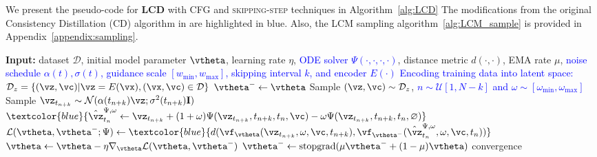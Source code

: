 \documentclass{article} %
\begin{document}
We present the pseudo-code for \textbf{LCD}
with CFG and \textsc{skipping-step} techniques in Algorithm~\ref{alg:LCD}
The modifications from the original Consistency Distillation (CD) algorithm in \cite{song2023consistency} are highlighted in blue.  Also, the LCM sampling algorithm~\ref{alg:LCM_sample} is provided in Appendix~\ref{appendix:sampling}.
\vspace{-10pt}
\begin{algorithm}[H]
    \begin{minipage}{\linewidth}
    \begin{footnotesize}
        \caption{Latent Consistency Distillation (LCD)}\label{alg:LCD}
        \begin{algorithmic}
            \STATE \textbf{Input:} dataset $\mathcal{D}$, initial model parameter $\vtheta$, learning rate $\eta$, \textcolor{blue}{ODE solver $\Psi(\cdot,\cdot,\cdot, \cdot)$}, distance metric $d(\cdot,\cdot)$, EMA rate $\mu$, \textcolor{blue}{noise schedule $\alpha(t),\sigma(t)$, guidance scale $[w_{\text{min}},w_{\text{max}}]$, skipping interval $k$, and encoder $E(\cdot)$}
            \STATE \textcolor{blue}{Encoding training data into latent space: $\mathcal{D}_z=\{(\vz,\vc)|\vz=E(\vx),(\vx,\vc)\in\mathcal{D}\}$}
            \STATE $\vtheta^-\leftarrow\vtheta$
            \REPEAT
            \STATE Sample $(\vz,\vc) \sim \mathcal{D}_z$, \textcolor{blue}{$n\sim \mathcal{U}[1,N-k]$ and $\omega\sim [\omega_\text{min},\omega_\text{max}]$}
            \STATE Sample $\vz_{t_{n+k}}\sim \mathcal{N}(\alpha(t_{n+k})\vz;\sigma^2(t_{n+k})\mathbf{I})$
            \STATE $\begin{aligned}\textcolor{blue}{\hat{\vz}^{\Psi,\omega}_{t_n}\leftarrow \vz_{t_{n+k}}+(1+\omega)\Psi(\vz_{t_{n+k}},t_{n+k},t_n,\vc)-\omega\Psi(\vz_{t_{n+k}},t_{n+k},t_n,\varnothing)}\end{aligned}$
            \STATE $\begin{aligned}\mathcal{L}(\vtheta,\vtheta^-; \Psi)\leftarrow \textcolor{blue}{d(\vf_\vtheta(\vz_{t_{n+k}},\omega,\vc, t_{n+k}),\vf_{\vtheta^-}(\hat{\vz}^{\Psi,\omega}_{t_n},\omega,\vc, t_n))}\end{aligned}$
          \STATE $\vtheta\leftarrow\vtheta-\eta\nabla_\vtheta\mathcal{L}(\vtheta,\vtheta^-)$
            \STATE $\vtheta^-\leftarrow \text{stopgrad}(\mu\vtheta^-+(1-\mu)\vtheta)$
            \UNTIL convergence
        \end{algorithmic} 
        \end{footnotesize}
    \end{minipage}
\end{algorithm}
\end{document}
